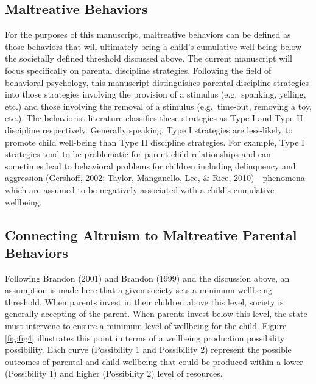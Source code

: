 \documentclass[review]{elsarticle}\usepackage[]{graphicx}\usepackage[]{color}
\begin{document}
\subsection{Maltreative Behaviors}\label{maltreative-behaviors}

For the purposes of this manuscript, maltreative behaviors can be
defined as those behaviors that will ultimately bring a child's
cumulative well-being below the societally defined threshold discussed
above. The current manuscript will focus specifically on parental
discipline strategies. Following the field of behavioral psychology,
this manuscript distinguishes parental discipline strategies into those
strategies involving the provision of a stimulus (e.g.~spanking,
yelling, etc.) and those involving the removal of a stimulus
(e.g.~time-out, removing a toy, etc.). The behaviorist literature
classifies these strategies as Type I and Type II discipline
respectively. Generally speaking, Type I strategies are less-likely to
promote child well-being than Type II discipline strategies. For
example, Type I strategies tend to be problematic for parent-child
relationships and can sometimes lead to behavioral problems for children
including delinquency and aggression (Gershoff, 2002; Taylor,
Manganello, Lee, \& Rice, 2010) - phenomena which are assumed to be
negatively associated with a child's cumulative wellbeing.

\subsection{Connecting Altruism to Maltreative Parental
Behaviors}\label{connecting-altruism-to-maltreative-parental-behaviors}

Following Brandon (2001) and Brandon (1999) and the discussion above, an
assumption is made here that a given society sets a minimum wellbeing
threshold. When parents invest in their children above this level,
society is generally accepting of the parent. When parents invest below
this level, the state must intervene to ensure a minimum level of
wellbeing for the child. Figure \ref{fig:fig4} illustrates this point in terms of a
wellbeing production possibility possibility. Each curve (Possibility 1
and Possibility 2) represent the possible outcomes of parental and child
wellbeing that could be produced within a lower (Possibility 1) and
higher (Possibility 2) level of resources. 
\end{document}

